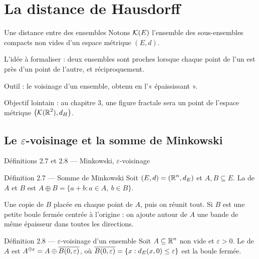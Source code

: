 \section{La distance de Hausdorff}

\begin{frame}{Une distance entre des ensembles}
  \small Notons $\mathcal{K}(E)$ l'ensemble des sous-ensembles compacts
  non vides d'un espace métrique $(E,d)$.
  \vspace{6pt}

  L'idée à formaliser : deux ensembles sont proches lorsque
  chaque point de l'un est près d'un point de l'autre, et
  réciproquement.
  \vspace{6pt}

  Outil : le voisinage d'un ensemble, obtenu en l'« épaississant ».
  \vspace{6pt}

  Objectif lointain : au chapitre 3, une figure fractale sera
  un point de l'espace métrique $\big(\mathcal{K}(\operatorname{\mathbb{R}}^2),d_H\big)$.
\end{frame}

\subsection[Le epsilon-voisinage et la somme de Minkowski]{Le \texorpdfstring{$\varepsilon$}{epsilon}-voisinage et la somme de Minkowski}

\begin{frame}{Définitions 2.7 et 2.8 --- Minkowski, $\varepsilon$-voisinage}
  \begin{Enonce}{Définition 2.7 --- Somme de Minkowski}
    \small Soit $(E,d)=(\operatorname{\mathbb{R}}^n,d_E)$ et $A,B\subseteq E$. La  de $A$ et $B$ est
    $A\oplus B = \{a+b : a\in A,\ b\in B\}$.
  \end{Enonce}
  \small Une copie de $B$ placée en chaque point de $A$, puis on réunit
  tout. Si $B$ est une petite boule fermée centrée à l'origine : on
  ajoute autour de $A$ une bande de même épaisseur dans toutes les
  directions.
  \begin{Enonce}{Définition 2.8 --- $\varepsilon$-voisinage d'un ensemble}
    \small Soit $A\subseteq\operatorname{\mathbb{R}}^n$ non vide et $\varepsilon>0$. Le
     de $A$ est
    $A^{\oplus \varepsilon} = A\oplus\overline{B(0, \varepsilon)}$,
    où $\overline{B(0, \varepsilon)} = \{x : d_E(x,0)\leq\varepsilon\}$
    est la boule fermée.
  \end{Enonce}
\end{frame}

